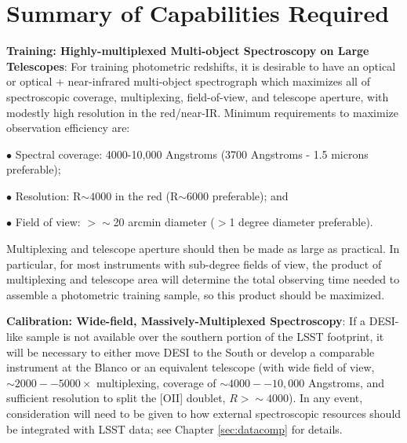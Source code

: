 %



\section{Summary of Capabilities Required}

{\bf Training: Highly-multiplexed Multi-object Spectroscopy on Large Telescopes}: For training photometric redshifts, it is desirable to have an optical or optical + near-infrared multi-object spectrograph which maximizes all of spectroscopic coverage, multiplexing, field-of-view, and telescope aperture, with modestly high resolution in the red/near-IR.  Minimum requirements to maximize observation efficiency are:

$\bullet$ Spectral coverage: 4000-10,000 Angstroms (3700 Angstroms - 1.5 microns preferable);

$\bullet$ Resolution: R$\sim 4000$ in the red (R$\sim 6000$ preferable); and

$\bullet$ Field of view: $>\sim$20 arcmin diameter ($>$1 degree diameter preferable).

Multiplexing and telescope aperture should then be made as large as practical.  In particular, for most instruments with sub-degree fields of view, the product of multiplexing and telescope area will determine the total observing time needed to assemble a photometric training sample, so this product should be maximized.  

{\bf Calibration: Wide-field, Massively-Multiplexed Spectroscopy}: If a DESI-like sample is not available over the southern portion of the LSST footprint, it will be necessary to either move DESI to the South or develop a comparable instrument at the Blanco or an equivalent telescope (with wide field of view, $\sim 2000--5000\times$ multiplexing, coverage of $\sim 4000--10,000$ Angstroms, and sufficient resolution to split the [OII] doublet, $R>\sim 4000$).  In any event, consideration will need to be given to how external spectroscopic resources should be integrated with LSST data; see Chapter \ref{sec:datacomp} for details.


